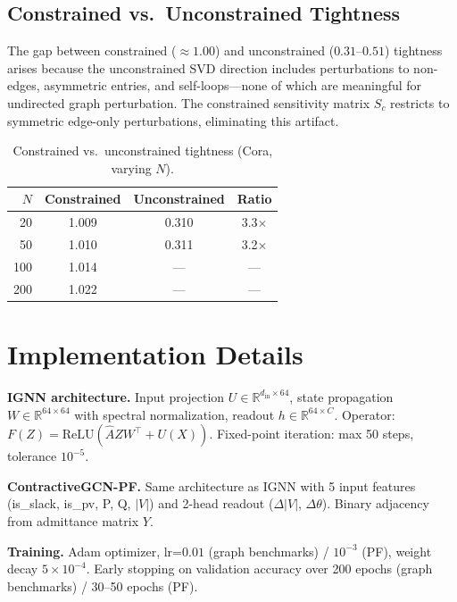 \documentclass[conference]{IEEEtran}
\newcommand{\R}{\mathbb{R}}
\newcommand{\Ahat}{\hat{A}}
\begin{document}
\subsection{Constrained vs.\ Unconstrained Tightness}

The gap between constrained ($\approx 1.00$) and unconstrained ($0.31$--$0.51$) tightness arises because the unconstrained SVD direction includes perturbations to non-edges, asymmetric entries, and self-loops---none of which are meaningful for undirected graph perturbation. The constrained sensitivity matrix $S_c$ restricts to symmetric edge-only perturbations, eliminating this artifact.

\begin{table}[h]
\centering
\caption{Constrained vs.\ unconstrained tightness (Cora, varying $N$).}
\small
\begin{tabular}{@{}rccc@{}}
\toprule
$N$ & Constrained & Unconstrained & Ratio \\
\midrule
20  & 1.009 & 0.310 & 3.3$\times$ \\
50  & 1.010 & 0.311 & 3.2$\times$ \\
100 & 1.014 & --- & --- \\
200 & 1.022 & --- & --- \\
\bottomrule
\end{tabular}
\end{table}

\section{Implementation Details}
\label{app:implementation}

\textbf{IGNN architecture.} Input projection $U \in \R^{d_{\text{in}} \times 64}$, state propagation $W \in \R^{64 \times 64}$ with spectral normalization, readout $h \in \R^{64 \times C}$. Operator: $F(Z) = \mathrm{ReLU}(\Ahat Z W^\top + U(X))$. Fixed-point iteration: max 50 steps, tolerance $10^{-5}$.

\textbf{ContractiveGCN-PF.} Same architecture as IGNN with 5 input features (is\_slack, is\_pv, P, Q, $|V|$) and 2-head readout ($\Delta|V|$, $\Delta\theta$). Binary adjacency from admittance matrix $Y$.

\textbf{Training.} Adam optimizer, lr=$0.01$ (graph benchmarks) / $10^{-3}$ (PF), weight decay $5 \times 10^{-4}$. Early stopping on validation accuracy over 200 epochs (graph benchmarks) / 30--50 epochs (PF).
\end{document}
